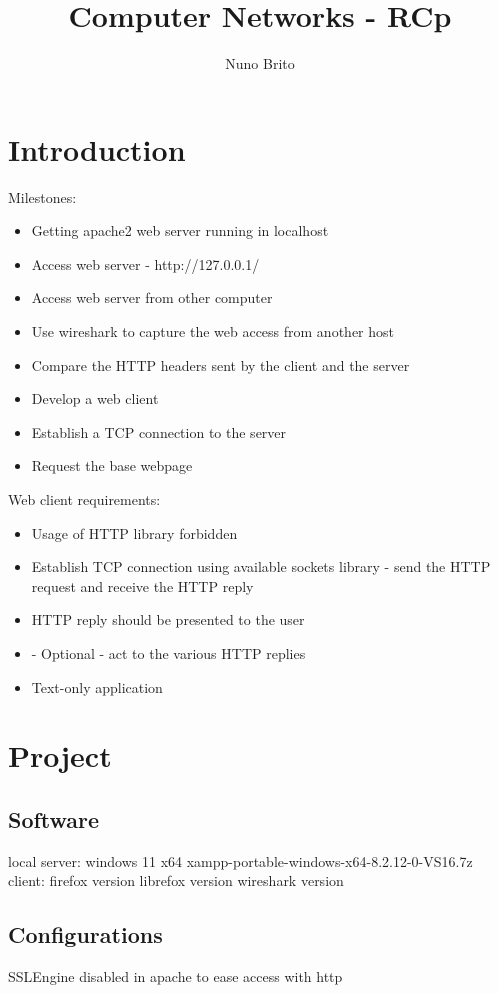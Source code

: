 \documentclass[11pt]{report}
\title{Computer Networks - RCp}
\author{Nuno Brito}
\begin{document}
\tableofcontents

\section{Introduction}
    Milestones:
    \begin{itemize}
        \item Getting apache2 web server running in localhost
        \item Access web server - http://127.0.0.1/
        \item Access web server from other computer
        \item Use wireshark to capture the web access from another host
        \item Compare the HTTP headers sent by the client and the server
        \item Develop a web client
        \item Establish a TCP connection to the server
        \item Request the base webpage
    \end{itemize}
    
    Web client requirements:
    \begin{itemize}
        \item Usage of HTTP library forbidden
        \item Establish TCP connection using available sockets library - send the HTTP request and receive the HTTP reply
        \item HTTP reply should be presented to the user
        \item - Optional - act to the various HTTP replies
        \item Text-only application
    \end{itemize}

\section{Project}
    \subsection{Software}
        local server:
            windows 11 x64
            xampp-portable-windows-x64-8.2.12-0-VS16.7z
        client:
            firefox version
            librefox version
            wireshark version
    
    \subsection{Configurations}
        SSLEngine disabled in apache to ease access with http
    
\end{document}
